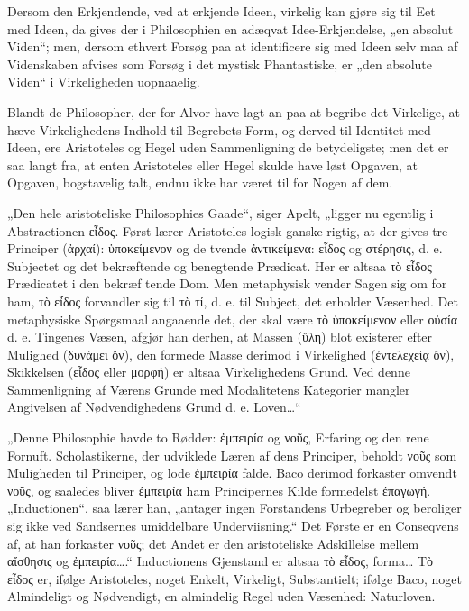 \documentclass[12pt]{book}
\newcommand{\opage}[1]{\marginnote{\footnotesize\textit{[#1]}}}
\begin{document}
Dersom den Erkjendende, ved at erkjende Ideen, virkelig kan gjøre sig til Eet med Ideen, da gives
der i Philosophien en adæqvat Idee-Erkjendelse, „en absolut Viden“; men, dersom ethvert Forsøg paa
at identificere sig med Ideen selv maa af Videnskaben afvises som Forsøg i det mystisk
Phantastiske, er „den absolute Viden“ i Virkeligheden uopnaaelig.

Blandt de Philosopher, der for Alvor have lagt an paa at begribe det Virkelige, at hæve
Virkelighedens Indhold til Begrebets Form, og derved til Identitet med Ideen, ere Aristoteles og
Hegel uden Sammenligning de betydeligste; men det er saa langt fra, at enten Aristoteles eller
Hegel skulde have løst Opgaven, at Opgaven, bogstavelig talt, endnu ikke har været til for Nogen
af dem.

„Den hele aristoteliske Philosophies Gaade“, siger Apelt, „ligger nu egentlig i Abstractionen
εἶδος. Først lærer Aristoteles logisk ganske rigtig, at der gives tre Principer (ἀρχαί):
ὑποκείμενον og de tvende ἀντικείμενα: εἶδος og στέρησις, d. e. Subjectet og det bekræftende og
benegtende Prædicat. Her er altsaa τὸ εἶδος Prædicatet i den bekræf%
\opage{160}tende Dom. Men metaphysisk vender Sagen sig om for ham, τὸ εἶδος forvandler sig til τὸ τί, d. e.
til Subject, det erholder Væsenhed. Det metaphysiske Spørgsmaal angaaende det, der skal være τὸ
ὑποκείμενον eller οὐσία d. e. Tingenes Væsen, afgjør han derhen, at Massen (ὕλη) blot existerer
efter Mulighed (δυνάμει ὄν), den formede Masse derimod i Virkelighed (ἐντελεχείᾳ ὄν), Skikkelsen
(εἶδος eller μορφή) er altsaa Virkelighedens Grund. Ved denne Sammenligning af Værens Grunde med
Modalitetens Kategorier mangler Angivelsen af Nødvendighedens Grund d. e. Loven…“

„Denne Philosophie havde to Rødder: ἐμπειρία og νοῦς, Erfaring og den rene Fornuft. Scholastikerne,
der udviklede Læren af dens Principer, beholdt νοῦς som Muligheden til Principer, og lode ἐμπειρία
falde. Baco derimod forkaster omvendt νοῦς, og saaledes bliver ἐμπειρία ham Principernes Kilde
formedelst ἐπαγωγή. „Inductionen“, saa lærer han, „antager ingen Forstandens Urbegreber og
beroliger sig ikke ved Sandsernes umiddelbare Underviisning.“ Det Første er en Conseqvens af, at
han forkaster νοῦς; det Andet er den aristoteliske Adskillelse mellem αἴσθησις og ἐμπειρία….“
Inductionens Gjenstand er altsaa τὸ εἶδος, forma… Τὸ εἶδος er, ifølge Aristoteles, noget Enkelt,
Virkeligt, Substantielt; ifølge Baco, noget Almindeligt og Nødvendigt, en almindelig Regel uden
Væsenhed: Naturloven.
\end{document}
